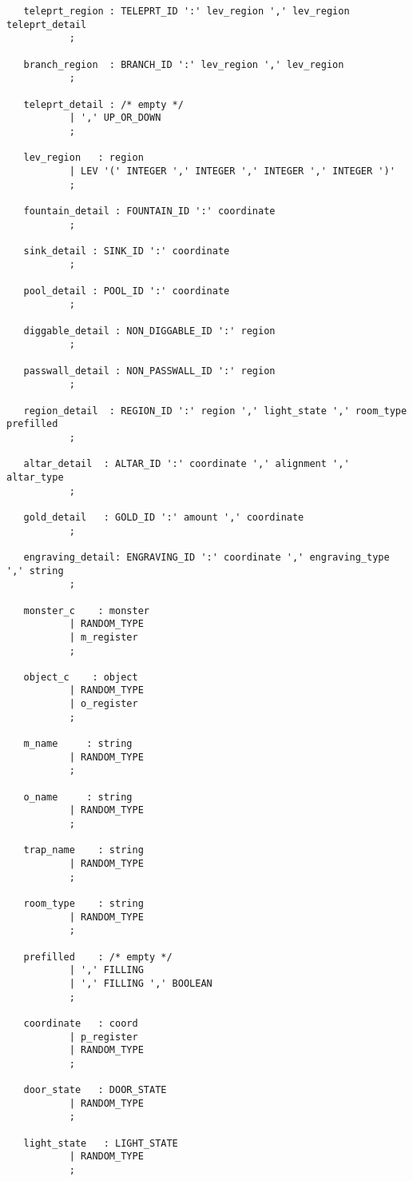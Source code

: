 \documentclass[11pt]{article}
\begin{document}
\begin{verbatim}
   teleprt_region : TELEPRT_ID ':' lev_region ',' lev_region teleprt_detail
           ;

   branch_region  : BRANCH_ID ':' lev_region ',' lev_region
           ;

   teleprt_detail : /* empty */
           | ',' UP_OR_DOWN
           ;

   lev_region   : region
           | LEV '(' INTEGER ',' INTEGER ',' INTEGER ',' INTEGER ')'
           ;

   fountain_detail : FOUNTAIN_ID ':' coordinate
           ;

   sink_detail : SINK_ID ':' coordinate
           ;

   pool_detail : POOL_ID ':' coordinate
           ;

   diggable_detail : NON_DIGGABLE_ID ':' region
           ;

   passwall_detail : NON_PASSWALL_ID ':' region
           ;

   region_detail  : REGION_ID ':' region ',' light_state ',' room_type prefilled
           ;

   altar_detail  : ALTAR_ID ':' coordinate ',' alignment ',' altar_type
           ;

   gold_detail   : GOLD_ID ':' amount ',' coordinate
           ;

   engraving_detail: ENGRAVING_ID ':' coordinate ',' engraving_type ',' string
           ;

   monster_c    : monster
           | RANDOM_TYPE
           | m_register
           ;

   object_c    : object
           | RANDOM_TYPE
           | o_register
           ;

   m_name     : string
           | RANDOM_TYPE
           ;

   o_name     : string
           | RANDOM_TYPE
           ;

   trap_name    : string
           | RANDOM_TYPE
           ;

   room_type    : string
           | RANDOM_TYPE
           ;

   prefilled    : /* empty */
           | ',' FILLING
           | ',' FILLING ',' BOOLEAN
           ;

   coordinate   : coord
           | p_register
           | RANDOM_TYPE
           ;

   door_state   : DOOR_STATE
           | RANDOM_TYPE
           ;

   light_state   : LIGHT_STATE
           | RANDOM_TYPE
           ;


\end{verbatim}
\end{document}
